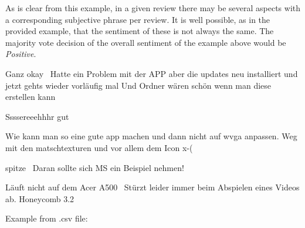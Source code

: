 As is clear from this example, in a given review there may be several aspects with a corresponding 
subjective phrase per review.
It is well possible, as in the provided example, that the sentiment of these is not always the 
same.
The majority vote decision of the overall sentiment of the example above would be \emph{Positive}.

\begin{examples}
\item Ganz okay \textbar\textbar\ Hatte ein Problem mit der APP aber die updates neu installiert und jetzt gehts wieder vorläufig mal Und Ordner wären schön wenn man diese erstellen kann \hfill{}
\end{examples}

\begin{examples}
\item Ssssereeehhhr gut \hfill{}
\end{examples}

\begin{examples}
\item Wie kann man so eine gute app machen und dann nicht auf wvga anpassen. Weg mit den matschtexturen und vor allem dem Icon x-( \hfill{}
\end{examples}

\begin{examples}
\item spitze \textbar\textbar\ Daran sollte sich MS ein Beispiel nehmen! \hfill{}
\end{examples}

\begin{examples}
\item Läuft nicht auf dem Acer A500 \textbar\textbar\ Stürzt leider immer beim Abspielen eines Videos ab. Honeycomb 3.2 \hfill{}
\end{examples}


Example from .csv file:

